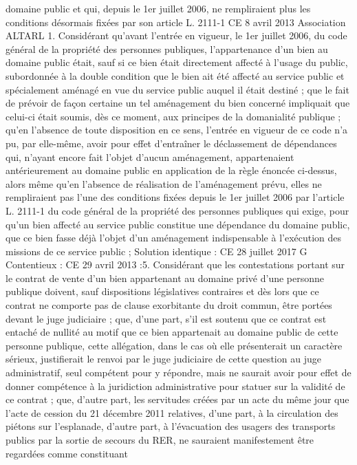 \documentclass[11pt,a4paper]{report}
\begin{document}
domaine public et qui, depuis le 1er juillet 2006, ne rempliraient plus les conditions désormais fixées par son
article L. 2111-1
CE 8 avril 2013 Association ALTARL 
1. Considérant qu'avant l'entrée en vigueur, le 1er juillet 2006, du code général de la propriété des personnes
publiques, l'appartenance d'un bien au domaine public était, sauf si ce bien était directement affecté à l'usage du
public, subordonnée à la double condition que le bien ait été affecté au service public et spécialement aménagé
en vue du service public auquel il était destiné ; que le fait de prévoir de façon certaine un tel aménagement du
bien concerné impliquait que celui-ci était soumis, dès ce moment, aux principes de la domanialité publique ;
qu'en l'absence de toute disposition en ce sens, l'entrée en vigueur de ce code n'a pu, par elle-même, avoir pour
effet d'entraîner le déclassement de dépendances qui, n'ayant encore fait l'objet d'aucun aménagement,
appartenaient antérieurement au domaine public en application de la règle énoncée ci-dessus, alors même qu'en
l'absence de réalisation de l'aménagement prévu, elles ne rempliraient pas l'une des conditions fixées depuis le
1er juillet 2006 par l'article L. 2111-1 du code général de la propriété des personnes publiques qui exige, pour
qu'un bien affecté au service public constitue une dépendance du domaine public, que ce bien fasse déjà l'objet
d'un aménagement indispensable à l'exécution des missions de ce service public ;
Solution identique : CE 28 juillet 2017 
G Contentieux :
CE 29 avril 2013  :5. Considérant que les contestations portant sur le contrat de vente d'un bien
appartenant au domaine privé d'une personne publique doivent, sauf dispositions législatives contraires et dès
lors que ce contrat ne comporte pas de clause exorbitante du droit commun, être portées devant le juge judiciaire
; que, d'une part, s'il est soutenu que ce contrat est entaché de nullité au motif que ce bien appartenait au domaine
public de cette personne publique, cette allégation, dans le cas où elle présenterait un caractère sérieux, justifierait
le renvoi par le juge judiciaire de cette question au juge administratif, seul compétent pour y répondre, mais ne
saurait avoir pour effet de donner compétence à la juridiction administrative pour statuer sur la validité de ce
contrat ; que, d'autre part, les servitudes créées par un acte du même jour que l'acte de cession du 21 décembre
2011 relatives, d'une part, à la circulation des piétons sur l'esplanade, d'autre part, à l'évacuation des usagers des
transports publics par la sortie de secours du RER, ne sauraient manifestement être regardées comme constituant
\end{document}
